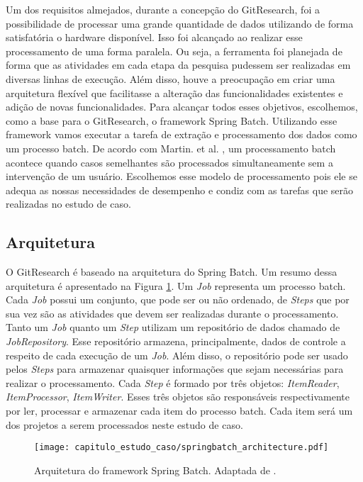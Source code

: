 Um dos requisitos almejados, durante a concepção do GitResearch, foi a possibilidade de processar uma grande quantidade de dados utilizando de forma satisfatória o hardware disponível. Isso foi alcançado ao realizar esse processamento de uma forma paralela. Ou seja, a ferramenta foi planejada de forma que as atividades em cada etapa da pesquisa pudessem ser realizadas em diversas linhas de execução. Além disso, houve a preocupação em criar uma arquitetura flexível que facilitasse a alteração das funcionalidades existentes e adição de novas funcionalidades. Para alcançar todos esses objetivos, escolhemos, como a base para o GitResearch, o framework Spring Batch\cite{cogoluegnes2011spring}. Utilizando esse framework vamos executar a tarefa de extração e processamento dos dados como um processo batch. De acordo com Martin. et al. \cite{martin2015batch}, um processamento batch acontece quando casos semelhantes são processados simultaneamente sem a intervenção de um usuário. Escolhemos esse modelo de processamento pois ele se adequa as nossas necessidades de desempenho e condiz com as tarefas que serão realizadas no estudo de caso.






\subsection{Arquitetura}

O GitResearch é baseado na arquitetura do Spring Batch. Um resumo dessa arquitetura é apresentado na Figura \ref{fig:arquitetura_gitresearch}. Um \textit{Job} representa um processo batch. Cada \textit{Job} possui um conjunto, que pode ser ou não ordenado, de \textit{Steps} que por sua vez são as atividades que devem ser realizadas durante o processamento. Tanto um \textit{Job} quanto um \textit{Step} utilizam um repositório de dados chamado de \textit{JobRepository}. Esse repositório armazena, principalmente, dados de controle a respeito de cada execução de um  \textit{Job}. Além disso, o repositório pode ser usado pelos \textit{Steps} para armazenar quaisquer informações que sejam necessárias para realizar o processamento. Cada \textit{Step} é formado por três objetos: \textit{ItemReader}, \textit{ItemProcessor}, \textit{ItemWriter}. Esses três objetos são responsáveis respectivamente por ler, processar e armazenar cada item do processo batch. Cada item será um dos projetos a serem processados neste estudo de caso. 


 \begin{figure}[H]
  \centering
  \texttt{[image: capitulo\_estudo\_caso/springbatch\_architecture.pdf]} 
  \caption{Arquitetura do framework Spring Batch. Adaptada de \cite{minella2011pro}.}
  \label{fig:arquitetura_gitresearch} 
\end{figure}

